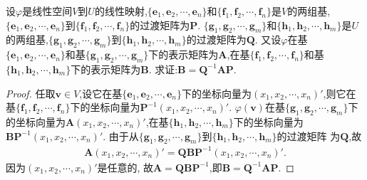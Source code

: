 \documentclass[lang=cn,newtx,10pt,scheme=chinese]{elegantbook}
\begin{document}
\begin{proposition}\label{proposition:线性映射与过渡矩阵}
设\(\varphi\)是线性空间\(V\)到\(U\)的线性映射,\(\{\boldsymbol{e}_1,\boldsymbol{e}_2,\cdots,\boldsymbol{e}_n\}\)和\(\{\boldsymbol{f}_1,\boldsymbol{f}_2,\cdots,\boldsymbol{f}_n\}\)是\(V\)的两组基,\(\{\boldsymbol{e}_1,\boldsymbol{e}_2,\cdots,\boldsymbol{e}_n\}\)到\(\{\boldsymbol{f}_1,\boldsymbol{f}_2,\cdots,\boldsymbol{f}_n\}\)的过渡矩阵为\(\boldsymbol{P}\). \(\{\boldsymbol{g}_1,\boldsymbol{g}_2,\cdots,\boldsymbol{g}_m\}\)和\(\{\boldsymbol{h}_1,\boldsymbol{h}_2,\cdots,\boldsymbol{h}_m\}\)是\(U\)的两组基,\(\{\boldsymbol{g}_1,\boldsymbol{g}_2,\cdots,\boldsymbol{g}_m\}\)到\(\{\boldsymbol{h}_1,\boldsymbol{h}_2,\cdots,\boldsymbol{h}_m\}\)的过渡矩阵为\(\boldsymbol{Q}\). 又设\(\varphi\)在基\(\{\boldsymbol{e}_1,\boldsymbol{e}_2,\cdots,\boldsymbol{e}_n\}\)和基\(\{\boldsymbol{g}_1,\boldsymbol{g}_2,\cdots,\boldsymbol{g}_m\}\)下的表示矩阵为\(\boldsymbol{A}\),在基\(\{\boldsymbol{f}_1,\boldsymbol{f}_2,\cdots,\boldsymbol{f}_n\}\)和基\(\{\boldsymbol{h}_1,\boldsymbol{h}_2,\cdots,\boldsymbol{h}_m\}\)下的表示矩阵为\(\boldsymbol{B}\). 求证:\(\boldsymbol{B}=\boldsymbol{Q}^{-1}\boldsymbol{A}\boldsymbol{P}\).
\end{proposition}
\begin{proof}
任取\(\boldsymbol{v}\in V\),设它在基\(\{\boldsymbol{e}_1,\boldsymbol{e}_2,\cdots,\boldsymbol{e}_n\}\)下的坐标向量为\((x_1,x_2,\cdots,x_n)'\),则它在基\(\{\boldsymbol{f}_1,\boldsymbol{f}_2,\cdots,\boldsymbol{f}_n\}\)下的坐标向量为\(\boldsymbol{P}^{-1}(x_1,x_2,\cdots,x_n)'\). \(\varphi(\boldsymbol{v})\)在基\(\{\boldsymbol{g}_1,\boldsymbol{g}_2,\cdots,\boldsymbol{g}_m\}\)下的坐标向量为\(\boldsymbol{A}(x_1,x_2,\cdots,x_n)'\),在基\(\{\boldsymbol{h}_1,\boldsymbol{h}_2,\cdots,\boldsymbol{h}_m\}\)下的坐标向量为\(\boldsymbol{B}\boldsymbol{P}^{-1}(x_1,x_2,\cdots,x_n)'\). 由于从\(\{\boldsymbol{g}_1,\boldsymbol{g}_2,\cdots,\boldsymbol{g}_m\}\)到\(\{\boldsymbol{h}_1,\boldsymbol{h}_2,\cdots,\boldsymbol{h}_m\}\)的过渡矩阵
为\(\boldsymbol{Q}\),故
\begin{align*}
\boldsymbol{A}(x_1,x_2,\cdots,x_n)'=\boldsymbol{Q}\boldsymbol{B}\boldsymbol{P}^{-1}(x_1,x_2,\cdots,x_n)'.  
\end{align*}
因为\((x_1,x_2,\cdots,x_n)'\)是任意的,
故\(\boldsymbol{A}=\boldsymbol{Q}\boldsymbol{B}\boldsymbol{P}^{-1}\),即\(\boldsymbol{B}=\boldsymbol{Q}^{-1}\boldsymbol{A}\boldsymbol{P}\).
\end{proof}
\end{document}
